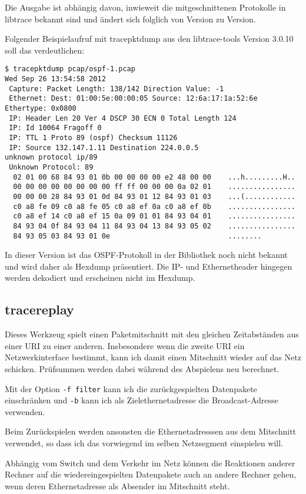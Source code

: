 \begin{normaltext}
  Die Ausgabe ist abhängig davon, inwieweit die mitgeschnittenen Protokolle in
  libtrace bekannt sind und ändert sich folglich von Version zu Version.

  Folgender Beispielaufruf mit tracepktdump aus den libtrace-tools Version
  3.0.10 soll das verdeutlichen:
  \begin{verbatim}
$ tracepktdump pcap/ospf-1.pcap
Wed Sep 26 13:54:58 2012
 Capture: Packet Length: 138/142 Direction Value: -1
 Ethernet: Dest: 01:00:5e:00:00:05 Source: 12:6a:17:1a:52:6e Ethertype: 0x0800
 IP: Header Len 20 Ver 4 DSCP 30 ECN 0 Total Length 124
 IP: Id 10064 Fragoff 0
 IP: TTL 1 Proto 89 (ospf) Checksum 11126
 IP: Source 132.147.1.11 Destination 224.0.0.5
unknown protocol ip/89
 Unknown Protocol: 89
  02 01 00 68 84 93 01 0b 00 00 00 00 e2 48 00 00    ...h.........H..
  00 00 00 00 00 00 00 00 ff ff 00 00 00 0a 02 01    ................
  00 00 00 28 84 93 01 0d 84 93 01 12 84 93 01 03    ...(............
  c0 a8 fe 09 c0 a8 fe 05 c0 a8 ef 0a c0 a8 ef 0b    ................
  c0 a8 ef 14 c0 a8 ef 15 0a 09 01 01 84 93 04 01    ................
  84 93 04 0f 84 93 04 11 84 93 04 13 84 93 05 02    ................
  84 93 05 03 84 93 01 0e                            ........                        

  \end{verbatim}
  In dieser Version ist das OSPF-Protokoll in der Bibliothek noch nicht
  bekannt und wird daher als Hexdump präsentiert.
  Die IP- und Ethernetheader hingegen werden dekodiert und erscheinen nicht
  im Hexdump.

  \subsection*{tracereplay}
  Dieses Werkzeug spielt einen Paketmitschnitt mit den gleichen Zeitabständen
  aus einer URI zu einer anderen. Insbesondere wenn die zweite URI ein
  Netzwerkinterface bestimmt, kann ich damit einen Mitschnitt wieder auf das
  Netz schicken.
  Prüfsummen werden dabei während des Abspielens neu berechnet.

  Mit der Option \verb?-f filter? kann ich die zurückgespielten Datenpakete
  einschränken und \verb?-b? kann ich als Zielethernetadresse die
  Broadcast-Adresse verwenden.

  Beim Zurückspielen werden ansonsten die Ethernetadresssen aus dem Mitschnitt
  verwendet, so dass ich das vorwiegend im selben Netzsegment einspielen will.

  Abhängig vom Switch und dem Verkehr im Netz können die Reaktionen anderer
  Rechner auf die wiedereingespielten Datenpakete auch an andere Rechner
  gehen, wenn deren Ethernetadresse als Absender im Mitschnitt steht.


\end{normaltext}
